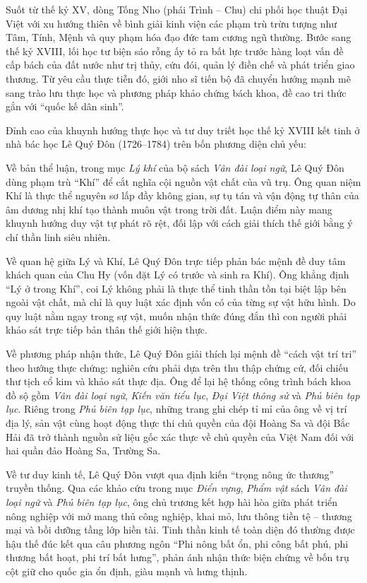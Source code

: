 Suốt từ thế kỷ XV, dòng Tống Nho (phái Trình -- Chu) chi phối học thuật Đại Việt với xu hướng thiên về bình giải kinh viện các phạm trù trừu tượng như Tâm, Tính, Mệnh và quy phạm hóa đạo đức tam cương ngũ thường. Bước sang thế kỷ XVIII, lối học tư biện sáo rỗng ấy tỏ ra bất lực trước hàng loạt vấn đề cấp bách của đất nước như trị thủy, cứu đói, quản lý điền chế và phát triển giao thương. Từ yêu cầu thực tiễn đó, giới nho sĩ tiến bộ đã chuyển hướng mạnh mẽ sang trào lưu thực học và phương pháp khảo chứng bách khoa, đề cao tri thức gắn với ``quốc kế dân sinh''.

Đỉnh cao của khuynh hướng thực học và tư duy triết học thế kỷ XVIII kết tinh ở nhà bác học Lê Quý Đôn (1726--1784) trên bốn phương diện chủ yếu:

Về bản thể luận, trong mục \textit{Lý khí} của bộ sách \textit{Vân đài loại ngữ}, Lê Quý Đôn dùng phạm trù ``Khí'' để cắt nghĩa cội nguồn vật chất của vũ trụ. Ông quan niệm Khí là thực thể nguyên sơ lấp đầy không gian, sự tụ tán và vận động tự thân của âm dương nhị khí tạo thành muôn vật trong trời đất. Luận điểm này mang khuynh hướng duy vật tự phát rõ rệt, đối lập với cách giải thích thế giới bằng ý chí thần linh siêu nhiên.

Về quan hệ giữa Lý và Khí, Lê Quý Đôn trực tiếp phản bác mệnh đề duy tâm khách quan của Chu Hy (vốn đặt Lý có trước và sinh ra Khí). Ông khẳng định ``Lý ở trong Khí'', coi Lý không phải là thực thể tinh thần tồn tại biệt lập bên ngoài vật chất, mà chỉ là quy luật xác định vốn có của từng sự vật hữu hình. Do quy luật nằm ngay trong sự vật, muốn nhận thức đúng đắn thì con người phải khảo sát trực tiếp bản thân thế giới hiện thực.

Về phương pháp nhận thức, Lê Quý Đôn giải thích lại mệnh đề ``cách vật trí tri'' theo hướng thực chứng: nghiên cứu phải dựa trên thu thập chứng cứ, đối chiếu thư tịch cổ kim và khảo sát thực địa. Ông để lại hệ thống công trình bách khoa đồ sộ gồm \textit{Vân đài loại ngữ}, \textit{Kiến văn tiểu lục}, \textit{Đại Việt thông sử} và \textit{Phủ biên tạp lục}. Riêng trong \textit{Phủ biên tạp lục}, những trang ghi chép tỉ mỉ của ông về vị trí địa lý, sản vật cùng hoạt động thực thi chủ quyền của đội Hoàng Sa và đội Bắc Hải đã trở thành nguồn sử liệu gốc xác thực về chủ quyền của Việt Nam đối với hai quần đảo Hoàng Sa, Trường Sa.

Về tư duy kinh tế, Lê Quý Đôn vượt qua định kiến ``trọng nông ức thương'' truyền thống. Qua các khảo cứu trong mục \textit{Điển vựng}, \textit{Phẩm vật} sách \textit{Vân đài loại ngữ} và \textit{Phủ biên tạp lục}, ông chủ trương kết hợp hài hòa giữa phát triển nông nghiệp với mở mang thủ công nghiệp, khai mỏ, lưu thông tiền tệ -- thương mại và bồi dưỡng tầng lớp hiền tài. Tinh thần kinh tế toàn diện đó thường được hậu thế đúc kết qua câu phương ngôn ``Phi nông bất ổn, phi công bất phú, phi thương bất hoạt, phi trí bất hưng'', phản ánh nhận thức biện chứng về bốn trụ cột giữ cho quốc gia ổn định, giàu mạnh và hưng thịnh.

